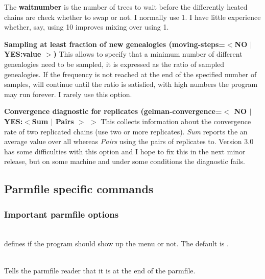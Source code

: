 \begin{description}
The {\bf waitnumber} is the number of trees to wait before the differently heated chains are check whether to swap or not. I normally use 1. I have little experience whether, say, using 10 improves mixing over using 1.

\item{ \bf Sampling at least fraction of new genealogies (moving-steps=$<$NO $|$ YES:value $>$)}
This allows to specify that a minimum number of different genealogies need to be sampled, it is expressed as the ratio of sampled genealogies. If the frequency is not reached at the end of the specified number of samples, \migrate will continue until the ratio is satisfied, with high numbers the program may run forever. I rarely use this option.
 
\item{ \bf Convergence diagnostic for replicates (gelman-convergence=$<$ NO $|$ YES:$<$Sum $|$ Pairs $>$ $>$}
This collects information about the convergence rate of two replicated chains (use two or more replicates). \textsl{Sum} reports the an average value over all whereas \textsl{Pairs} using the pairs of replicates to. Version 3.0 has some difficulties with this option and I hope to fix this in the next minor release, but on some machine and under some conditions the diagnostic fails.
 
\end{description}
\subsection{Parmfile specific commands}
\subsubsection{Important parmfile options}
\begin{description}
\item{}\\
defines if the program should show up the menu or not.
The default is {}.

\item{}\\
Tells the parmfile reader that it is at the end of the parmfile.
\end{description}


